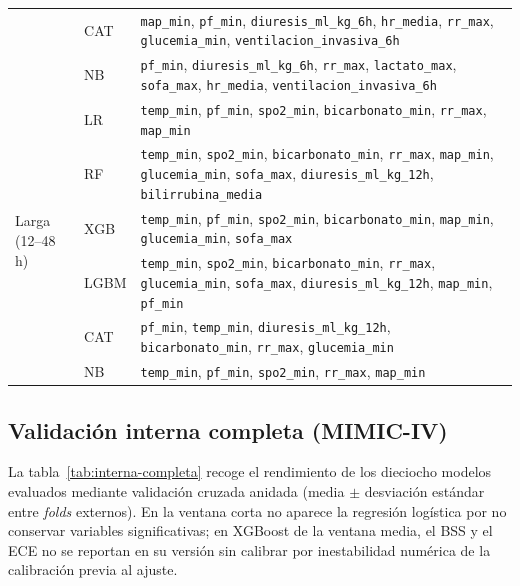 \documentclass[
  spanish,
  a4paper,
  12pt,
  twoside]{memoir}
\begin{document}
\begin{table}[htbp]
{\begin{tabular}{l l p{10.5cm}}
      & CAT  & \texttt{map\_min}, \texttt{pf\_min}, \texttt{diuresis\_ml\_kg\_6h}, \texttt{hr\_media}, \texttt{rr\_max}, \texttt{glucemia\_min}, \texttt{ventilacion\_invasiva\_6h} \\
      & NB   & \texttt{pf\_min}, \texttt{diuresis\_ml\_kg\_6h}, \texttt{rr\_max}, \texttt{lactato\_max}, \texttt{sofa\_max}, \texttt{hr\_media}, \texttt{ventilacion\_invasiva\_6h} \\
    \midrule
    \multirow{6}{*}{Larga (12--48\,h)}
      & LR   & \texttt{temp\_min}, \texttt{pf\_min}, \texttt{spo2\_min}, \texttt{bicarbonato\_min}, \texttt{rr\_max}, \texttt{map\_min} \\
      & RF   & \texttt{temp\_min}, \texttt{spo2\_min}, \texttt{bicarbonato\_min}, \texttt{rr\_max}, \texttt{map\_min}, \texttt{glucemia\_min}, \texttt{sofa\_max}, \texttt{diuresis\_ml\_kg\_12h}, \texttt{bilirrubina\_media} \\
      & XGB  & \texttt{temp\_min}, \texttt{pf\_min}, \texttt{spo2\_min}, \texttt{bicarbonato\_min}, \texttt{map\_min}, \texttt{glucemia\_min}, \texttt{sofa\_max} \\
      & LGBM & \texttt{temp\_min}, \texttt{spo2\_min}, \texttt{bicarbonato\_min}, \texttt{rr\_max}, \texttt{glucemia\_min}, \texttt{sofa\_max}, \texttt{diuresis\_ml\_kg\_12h}, \texttt{map\_min}, \texttt{pf\_min} \\
      & CAT  & \texttt{pf\_min}, \texttt{temp\_min}, \texttt{diuresis\_ml\_kg\_12h}, \texttt{bicarbonato\_min}, \texttt{rr\_max}, \texttt{glucemia\_min} \\
      & NB   & \texttt{temp\_min}, \texttt{pf\_min}, \texttt{spo2\_min}, \texttt{rr\_max}, \texttt{map\_min} \\
    \bottomrule
  \end{tabular}%
  }
\end{table}

\subsection*{Validación interna completa (MIMIC-IV)}

La tabla~\ref{tab:interna-completa} recoge el rendimiento de los dieciocho modelos evaluados mediante validación cruzada anidada (media $\pm$ desviación
estándar entre \emph{folds} externos). En la ventana corta no aparece la regresión logística por no conservar variables significativas; en XGBoost de la
ventana media, el BSS y el ECE no se reportan en su versión sin calibrar por inestabilidad numérica de la calibración previa al ajuste.
\end{document}
